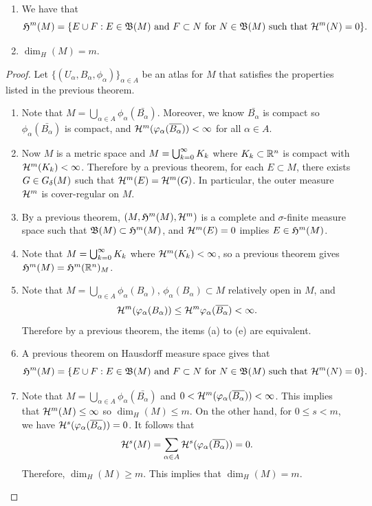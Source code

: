 \documentclass[a4paper]{article}
\begin{document}
\begin{thm}
\begin{enumerate}
\item We have that
\begin{equation*}
\mathfrak{H}^m(M) = \{ E\cup F : E \in \mathfrak{B} (M) \text{ and } F
\subset N \text{ for } N \in \mathfrak{B} (M) \text{ such that }
\mathcal{H}^m(N) = 0 \}.
\end{equation*}

\item $\dim_H(M) = m$.
\end{enumerate}
\end{thm}

\begin{proof}
Let $\{(U_\alpha, B_\alpha, \phi_\alpha)\}_{\alpha \in A}$
be an atlas for $M$ that satisfies the properties listed 
in the previous theorem.
\begin{enumerate}
\item Note that $M = \bigcup_{\alpha \in A} 
\phi_\alpha (\bar{B_\alpha})$. Moreover,
we know $\bar{B_\alpha}$ is compact
so $\phi_\alpha (\bar{B_\alpha})$ is compact, and  
$\mathcal{H}^m (\varphi_\alpha (\overline{B_\alpha})) < \infty$
for all $\alpha \in A$.

\item Now $M$ is a metric space and $M = \bigcup_{k=0}^\infty K_k$ 
where $K_k \subset \mathbb{R}^n$ is compact with $\mathcal{H}^m (K_k) < \infty$.
Therefore by a previous theorem, for each $E \subset M$,  
there exists $G \in G_\delta (M)$ such that $\mathcal{H}^m (E)
= \mathcal{H}^m (G)$. In particular, the outer measure 
$\mathcal{H}^m$ is cover-regular on $M$.

\item By a previous theorem, $(M, \mathfrak{H}^m (M), 
\mathcal{H}^m)$ is a complete and $\sigma$-finite measure space such 
that $\mathfrak{B}(M) \subset \mathfrak{H}^m(M)$, and $\mathcal{H}^m (E) = 0$
implies $E \in \mathfrak{H}^m(M)$.

\item Note that $M = \bigcup_{k=0}^\infty K_k$ where $\mathcal{H}^m (K_k) < \infty$, 
so a previous theorem gives $\mathfrak{H}^m (M) = \mathfrak{H}^m 
(\mathbb{R}^n)_M$.

\item Note that $M = \bigcup_{\alpha \in A} \phi_\alpha 
(B_\alpha)$, $\phi_\alpha (B_\alpha) \subset M$ relatively 
open in $M$, and 
\[
\mathcal{H}^m (\varphi_\alpha(B_\alpha)) 
\leq \mathcal{H}^m \varphi_\alpha (\overline{B_\alpha}) < \infty.
\]
Therefore by a previous theorem, 
the items (a) to (e) are equivalent.

\item A previous theorem on Hausdorff measure space 
gives that 
\[
\mathfrak{H}^m (M) = \{E \cup F : \text{$E \in \mathfrak{B}(M)$ 
and $F \subset N$ for $N \in \mathfrak{B}(M)$ such that 
$\mathcal{H}^m(N) = 0$}\}.
\]

\item Note that $M = \bigcup_{\alpha \in A} \phi_\alpha 
(\bar{B_\alpha})$ and $0 < \mathcal{H}^m (\varphi_\alpha (\overline{B_\alpha})) 
< \infty$. This implies that $\mathcal{H}^m (M) \leq \infty$ so 
$\dim_H (M) \leq m$. On the other hand, for $0 \leq s < m$,
we have $\mathcal{H}^s(\varphi_\alpha (\overline{B_\alpha})) = 0$. 
It follows that 
\[
\mathcal{H}^s (M) 
= \sum_{\alpha \in A} \mathcal{H}^s (\varphi_\alpha (\overline{B_\alpha}))
= 0.
\]
Therefore, $\dim_H (M) \geq m$. This implies that 
$\dim_H (M) = m$.
\end{enumerate}
\end{proof}
\end{document}
